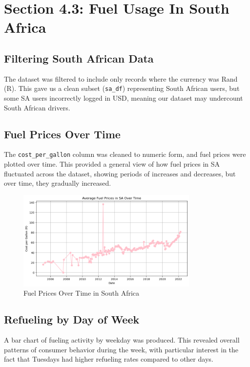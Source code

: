 \documentclass{article}
\begin{document}
\section*{Section 4.3: Fuel Usage In South Africa}

\subsection*{Filtering South African Data}
The dataset was filtered to include only records where the currency was Rand (R). This gave us a clean subset (\texttt{sa\_df}) representing South African users, but some SA users incorrectly logged in USD, meaning our dataset may undercount South African drivers.

\subsection*{Fuel Prices Over Time}
The \texttt{cost\_per\_gallon} column was cleaned to numeric form, and fuel prices were plotted over time. This provided a general view of how fuel prices in SA fluctuated across the dataset, showing periods of increases and decreases, but over time, they gradually increased.

\begin{figure}[H]
    \centering
    \includegraphics[width=0.8\textwidth]{images/Average Fuel Prices.png}
    \caption{Fuel Prices Over Time in South Africa}
\end{figure}


\subsection*{Refueling by Day of Week}
A bar chart of fueling activity by weekday was produced. This revealed overall patterns of consumer behavior during the week, with particular interest in the fact that Tuesdays had higher refueling rates compared to other days.
\end{document}
